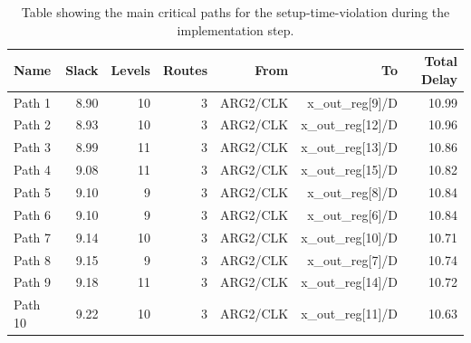 \begin{table}[ht]
    \centering
    \small
    \captionsetup{skip=10pt} 
    \begin{tabular}{lrrrrrr}
        \hline
        Name    & Slack & Levels & Routes & From      & To                 & Total Delay \\
        \hline
        Path 1  & 8.90  & 10     & 3      & ARG2/CLK  & x\_out\_reg[9]/D   & 10.99       \\
        Path 2  & 8.93  & 10     & 3      & ARG2/CLK  & x\_out\_reg[12]/D  & 10.96       \\
        Path 3  & 8.99  & 11     & 3      & ARG2/CLK  & x\_out\_reg[13]/D  & 10.86       \\
        Path 4  & 9.08  & 11     & 3      & ARG2/CLK  & x\_out\_reg[15]/D  & 10.82       \\
        Path 5  & 9.10  & 9      & 3      & ARG2/CLK  & x\_out\_reg[8]/D   & 10.84       \\
        Path 6  & 9.10  & 9      & 3      & ARG2/CLK  & x\_out\_reg[6]/D   & 10.84       \\
        Path 7  & 9.14  & 10     & 3      & ARG2/CLK  & x\_out\_reg[10]/D  & 10.71       \\
        Path 8  & 9.15  & 9      & 3      & ARG2/CLK  & x\_out\_reg[7]/D   & 10.74       \\
        Path 9  & 9.18  & 11     & 3      & ARG2/CLK  & x\_out\_reg[14]/D  & 10.72       \\
        Path 10 & 9.22  & 10     & 3      & ARG2/CLK  & x\_out\_reg[11]/D  & 10.63       \\
        \hline
    \end{tabular}
    \caption{Table showing the main critical paths for the setup-time-violation during the implementation step.}
    \label{tab:setup_implementation}
\end{table}


